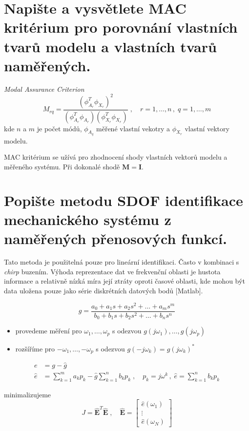\documentclass{article}
\begin{document}
	\section{Napište a vysvětlete MAC kritérium pro porovnání vlastních tvarů modelu a vlastních tvarů naměřených. }
	\emph{Modal Assurance Criterion}
	\begin{equation}
	M_{rq} = \frac{(\phi_{A_r}^T \phi_{X_r})^2}{(\phi_{A_r}^T\phi_{A_r})(\phi_{X_r}^T\phi_{X_r})}
	\;,\quad 
	r = 1,\dots,n \,,\; q = 1,\dots,m
	\end{equation}
	kde $n$ a $m$ je počet módů, $\phi_{A_q}$ měřené vlastní vekotry a $\phi_{X_r}$ vlastní vektory modelu.

	MAC kritérium se užívá pro zhodnocení shody vlastních vektorů modelu a měřeného systému. Při dokonalé shodě $\bm{M} = \bm{I}$.

	\section{Popište metodu SDOF identifikace mechanického systému z naměřených přenosových funkcí. }
	Tato metoda je použitelná pouze pro lineární identifikaci. Často v kombinaci s \emph{chirp} buzením. Výhoda reprezentace dat ve frekvenční oblasti je hustota informace a relativně nízká míra její ztráty oproti časové oblasti, kde mohou být data uložena pouze jako série diskrétních datových bodů [Matlab].

	\begin{equation}
		g = \frac{a_0 + a_1 s + a_2 s^2 + \dots + a_m s^m}{b_0 + b_1 s + b_2 s^2 + \dots + b_n s^n}
	\end{equation}

	\begin{itemize}
	\item provedeme měření pro $\omega_1, \dots, \omega_p$ s odezvou $g(j\omega_1),\dots,g(j\omega_p)$
	\item rozšíříme pro $-\omega_1, \dots, -\omega_p$ s odezvou $g(-j\omega_k)=g(j\omega_k)^*$
	\end{itemize}

	\begin{align}
		e &= g-\hat{g} \\
		\hat{e} &= \sum_{k=1}^m a_{k} p_{k} - \hat{g} \sum_{k=1}^n b_{k} p_{k}
		\;,\quad p_{k}=j \omega^{k} \,,\; \hat{e} = \sum_{k=1}^n b_{k} p_{k}
	\end{align}

	minimalizujeme
	\begin{equation}
	J = \bm{\hat{E}}^T\bm{\hat{E}}
	\;,\quad 
	\bm{\hat{E}}
	=
	\begin{bmatrix}
		\hat{e}(\omega_1) \\
		\vdots \\
		\hat{e}(\omega_N)
	\end{bmatrix}
	\end{equation}
\end{document}
